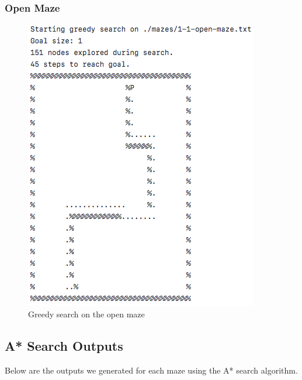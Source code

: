 \documentclass[titlepage]{article}
\begin{document}
\subsubsection{Open Maze}
\begin{figure}[h!]
\includegraphics[width=\linewidth]{greedyopen.png}
\caption{Greedy search on the open maze}
\label{fig:GREEDYopen}
\end{figure}

\newpage

\subsection{A* Search Outputs}
Below are the outputs we generated for each maze using the A* search algorithm. 
\end{document}
